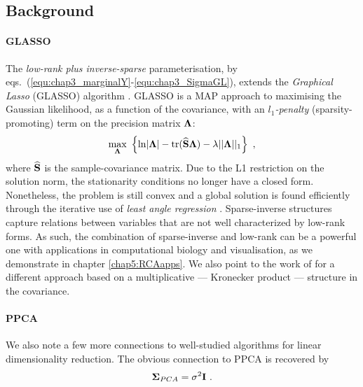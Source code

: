 
    \subsection{Background} \label{subsec:chap3_related_work}
      \paragraph{GLASSO} The \textit{low-rank plus inverse-sparse}
      parameterisation, by eqs.~(\ref{equ:chap3_marginalY}-\ref{equ:chap3_SigmaGL}), extends the \textit{Graphical Lasso} (GLASSO) algorithm \citep{Friedman:sparse08, Banerjee:model2008}. GLASSO is a MAP approach to maximising the Gaussian likelihood, as a function of the covariance, with an \textit{$l_1$-penalty} (sparsity-promoting) term on the precision matrix $\mathbf{\Lambda}$:
      \begin{equation} \label{equ:chap3_P1}
	\underset{\mathbf{\Lambda}}{ \textrm{max} } ~ \left\{ \ln \lvert \mathbf{\Lambda} \rvert - \textrm{tr}( \widehat{\mathbf{S}} \mathbf{\Lambda} ) - \lambda \vert\vert \mathbf{\Lambda} \vert\vert_{1} \right\} ~,
      \end{equation}
      where $\widehat{\mathbf{S}}$ is the sample-covariance matrix.
      Due to the L1 restriction on the solution norm, the stationarity conditions no longer have a closed form.
      Nonetheless, the problem is still convex and a global solution is found efficiently through the iterative use of \textit{least angle regression} \citep{Hastie:elements09}.
      Sparse-inverse structures capture relations between variables that are not well characterized by low-rank forms.
      As such, the combination of sparse-inverse and low-rank can be a powerful one with applications in computational biology and visualisation, as we demonstrate in chapter \ref{chap5:RCAapps}.
      We also point to the work of \citet{stegle:efficient11} for a different approach based on a multiplicative --- Kronecker product --- structure in the covariance.

      \paragraph{PPCA} We also note a few more connections to well-studied algorithms for linear dimensionality reduction. The obvious connection to PPCA is recovered by
      \[
	\mathbf{\Sigma}_{PCA} = \sigma^2 \mathbf{I} ~.
      \]
